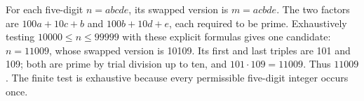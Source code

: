 For each five-digit $n=abcde$, its swapped version is $m=acbde$. The two factors are $100a+10c+b$ and $100b+10d+e$, each required to be prime. Exhaustively testing $10000\le n\le99999$ with these explicit formulas gives one candidate: $n=11009$, whose swapped version is 10109. Its first and last triples are 101 and 109; both are prime by trial division up to ten, and $101\cdot109=11009$. Thus $\boxed{11009}$. The finite test is exhaustive because every permissible five-digit integer occurs once.
